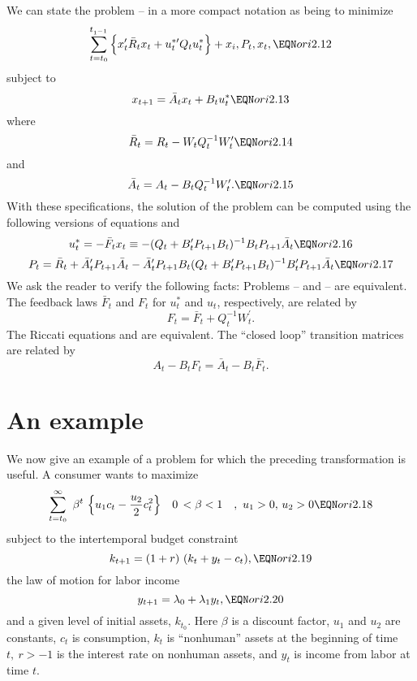 We can state the problem -- in a more compact
notation as being to minimize
$$\sum^{t_{1^{-1}}}_{t=t_0} \, \Bigl\{x^\prime_t \bar R_t x_t +
u_t^{\ast \prime} Q_t u^\ast_t \Bigr\} + x_i, P_t, x_t ,\EQN ori2.12$$
subject to
$$x_{t+1} = \bar A_t x_t + B_t u^\ast_t \EQN ori2.13$$
where
$$\bar R_t = R_t - W_t Q_t^{-1} W^\prime_t \EQN ori2.14$$
and
$$\bar A_t = A_t - B_t Q^{-1}_t W^\prime_t. \EQN ori2.15$$
With these specifications, the solution of the problem can be computed using
the following versions of equations  and 
$$u^\ast_t = -\bar F_t x_t \equiv - (Q_t + B^\prime_t P_{t+1} B_t)^{-1} B_t
P_{t+1} \bar A_t \EQN ori2.16$$
$$P_t = \bar R_t + \bar A^\prime_t P_{t+1} \bar A_t - \bar A^\prime_t P_{t+1}
B_t (Q_t +
B^\prime_t P_{t+1} B_t)^{-1} B^\prime_t P_{t+1} \bar A_t \EQN ori2.17$$
We ask the reader to verify the following facts:
  Problems -- and -- are equivalent.
 The feedback laws $\bar F_t$ and $F_t$ for $u^\ast_t$ and
$u_t$, respectively, are related by
$$F_t = \bar F_t + Q_t^{-1} W^\prime_t.$$
  The Riccati equations  and 
are equivalent.
  The ``closed loop'' transition matrices are related by
$$A_t - B_t F_t = \bar A_t - B_t \bar F_t .$$

\section{An example}
We now give an example of a problem for which the preceding transformation is
useful.  A consumer wants to maximize
$$\sum^\infty_{t=t_0}\ \beta^t\ \Bigl\{ u_1 c_t-{u_2 \over 2}c^2_t \Bigr \}
\quad 0 \, < \beta < 1\quad ,\ u_1> 0,\, u_2>0 \EQN ori2.18$$
subject to the intertemporal budget constraint
$$k_{t+1} = (1 + r)\ (k_t + y_t - c_t) , \EQN ori2.19$$
the law of motion for labor income
$$y_{t+1} = \lambda_0 + \lambda_1 y_t, \EQN ori2.20$$
and a given level of initial assets, $k_{t_0}$.  Here $\beta$ is a discount
factor, $u_1$ and $u_2$ are constants, $c_t$ is consumption, $k_t$ is
``nonhuman'' assets at the beginning of time $t,\  r > -1$ is the interest
rate on nonhuman assets, and $y_t$ is income from labor at time $t$.

